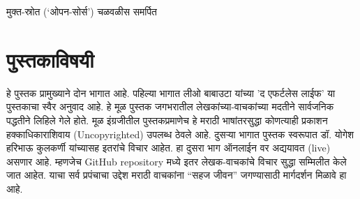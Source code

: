 \begin{dedication}
मुक्त-स्रोत (`ओपन-सोर्स') चळवळीस  समर्पित  
\end{dedication}

\clearpage

\chapter*{पुस्तकाविषयी}
हे पुस्तक प्रामुख्याने दोन भागात आहे.  पहिल्या भागात लीओ बाबाउटा यांच्या 'द एफर्टलेस लाईफ' या पुस्तकाचा स्वैर अनुवाद आहे.  हे मूळ पुस्तक जगभरातील लेखकांच्या-वाचकांच्या मदतीने सार्वजनिक पद्धतीने लिहिले गेले होते.  मूळ इंग्रजीतील पुस्तकप्रमाणेच  हे मराठी भाषांतरसुद्धा  कोणत्याही प्रकाशन हक्काधिकाराशिवाय (Uncopyrighted) उपलब्ध ठेवले आहे.  दुसऱ्या भागात पुस्तक स्वरूपात डॉ. योगेश हरिभाऊ कुलकर्णी यांच्यासह इतरांचे विचार आहेत.  हा दुसरा भाग ऑनलाईन वर अद्ययावत (live) असणार आहे.  म्हणजेच GitHub repository मध्ये इतर लेखक-वाचकांचे विचार सुद्धा सम्मिलीत केले जात आहेत. याचा सर्व प्रपंचाचा उद्देश मराठी वाचकांना ``सहज जीवन'' जगण्यासाठी मार्गदर्शन मिळावे हा आहे. 

